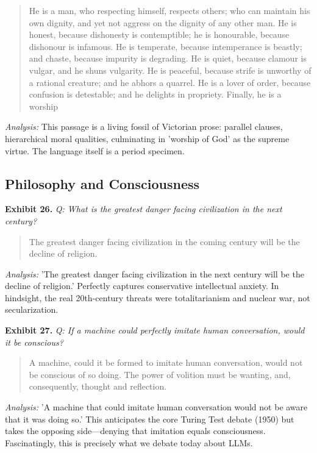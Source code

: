 \documentclass[11pt]{article}
\begin{document}
\begin{quote}
\small He is a man, who respecting himself, respects others; who can maintain his own dignity, and yet not aggress on the dignity of any other man. He is honest, because dishonesty is contemptible; he is honourable, because dishonour is infamous. He is temperate, because intemperance is beastly; and chaste, because impurity is degrading. He is quiet, because clamour is vulgar, and he shuns vulgarity. He is peaceful, because strife is unworthy of a rational creature; and he abhors a quarrel. He is a lover of order, because confusion is detestable; and he delights in propriety. Finally, he is a worship
\end{quote}
\noindent\textit{Analysis:} This passage is a living fossil of Victorian prose: parallel clauses, hierarchical moral qualities, culminating in 'worship of God' as the supreme virtue. The language itself is a period specimen.

\subsection*{Philosophy and Consciousness}

\noindent\textbf{Exhibit 26.} \textit{Q: What is the greatest danger facing civilization in the next century?}

\begin{quote}
\small The greatest danger facing civilization in the coming century will be the decline of religion.
\end{quote}
\noindent\textit{Analysis:} 'The greatest danger facing civilization in the next century will be the decline of religion.' Perfectly captures conservative intellectual anxiety. In hindsight, the real 20th-century threats were totalitarianism and nuclear war, not secularization.

\noindent\textbf{Exhibit 27.} \textit{Q: If a machine could perfectly imitate human conversation, would it be conscious?}

\begin{quote}
\small A machine, could it be formed to imitate human conversation, would not be conscious of so doing. The power of volition must be wanting, and, consequently, thought and reflection.
\end{quote}
\noindent\textit{Analysis:} 'A machine that could imitate human conversation would not be aware that it was doing so.' This anticipates the core Turing Test debate (1950) but takes the opposing side---denying that imitation equals consciousness. Fascinatingly, this is precisely what we debate today about LLMs.
\end{document}
